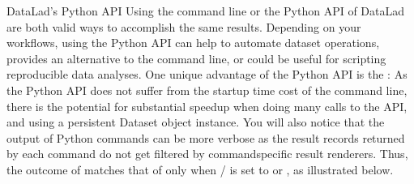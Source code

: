 \begin{findoutmore}[label={fom-pythonapi}, before title={\thetcbcounter\ }, float, check odd page=true]{DataLad’s Python API}
\sphinxAtStartPar
Using the command line or the Python API of DataLad are both valid ways to accomplish the same results.
Depending on your workflows, using the Python API can help to automate dataset operations, provides an alternative
to the command line, or could be useful for scripting reproducible data analyses.
One unique advantage of the Python API is the :
As the Python API does not suffer from the startup time cost of the command line,
there is the potential for substantial speed\sphinxhyphen{}up when doing many calls to the API,
and using a persistent Dataset object instance.
You will also notice that the output of Python commands can be more verbose as the result records returned by each command do not get filtered by command\sphinxhyphen{}specific result renderers.
Thus, the outcome of  matches that of  only when / is set to  or , as illustrated below.

\begin{sphinxVerbatim}[commandchars=\\\{\}]
   
\PYG{g+go}{[\PYGZob{}\PYGZsq{}type\PYGZsq{}: \PYGZsq{}file\PYGZsq{},}
\PYG{g+go}{\PYGZsq{}action\PYGZsq{}: \PYGZsq{}status\PYGZsq{}\PYGZcb{}]}
\end{sphinxVerbatim}


\end{findoutmore}
